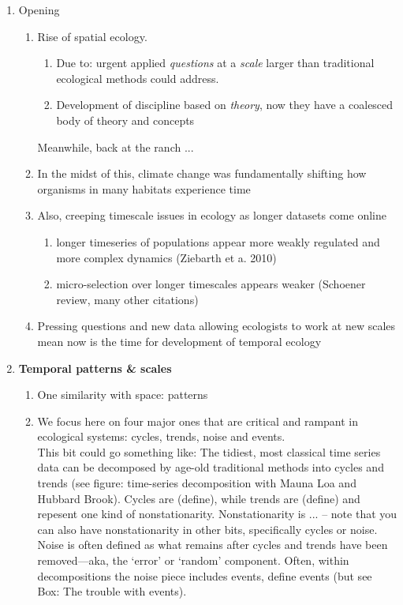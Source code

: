 \documentclass[11pt,a4paper]{article}
\begin{document}
\begin{enumerate}
\item Opening
\begin{enumerate}
\item Rise of spatial ecology. 
\begin{enumerate}
\item Due to: urgent applied \emph{questions} at a \emph{scale} larger than traditional ecological methods could address. 
\item Development of discipline based on \emph{theory}, now they have a coalesced body of theory and concepts
\end{enumerate}
Meanwhile, back at the ranch ... 
\item In the midst of this, climate change was fundamentally shifting how organisms in many habitats experience time
\item Also, creeping timescale issues in ecology as longer datasets come online
\begin{enumerate}
\item longer timeseries of populations appear more weakly regulated and more complex dynamics (Ziebarth et a. 2010)
\item micro-selection over longer timescales appears weaker (Schoener review, many other citations)
\end{enumerate}
\item Pressing questions and new data allowing ecologists to work at new scales mean now is the time for development of temporal ecology
\end{enumerate}
\item {\bf Temporal patterns \& scales}
\begin{enumerate}
\item One similarity with space: patterns
\item We focus here on four major ones that are critical and rampant in ecological systems: cycles, trends, noise and events. \\
This bit could go something like: The tidiest, most classical time series data can be decomposed by age-old traditional methods into cycles and trends (see figure: time-series decomposition with Mauna Loa and Hubbard Brook). Cycles are (define), while trends are (define) and repesent one kind of nonstationarity. Nonstationarity is ... -- note that you can also have nonstationarity in other bits, specifically cycles or noise. Noise is often defined as what remains after cycles and trends have been removed---aka, the `error' or `random' component. Often, within decompositions the noise piece includes events, define events (but see Box: The trouble with events).

\end{enumerate}
\end{enumerate}
\end{document}
